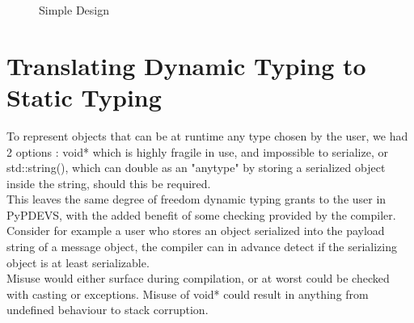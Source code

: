 \documentclass[8pt,a4paper]{report}
\begin{document}
\begin{figure}[h!]
	\caption{Simple Design}
	\label{simpledesign}
\end{figure}



\section{Translating Dynamic Typing to Static Typing}
To represent objects that can be at runtime any type chosen by the user, we had 2 options : void* which is highly fragile in use, and impossible to serialize, or std::string(), which can double as an "anytype" by storing a serialized object inside the string, should this be required. \\This leaves the same degree of freedom dynamic typing grants to the user in PyPDEVS, with the added benefit of some checking provided by the compiler. Consider for example a user who stores an object serialized into the payload string of a message object, the compiler can in advance detect if the serializing object is at least serializable. \\ Misuse would either surface during compilation, or at worst could be checked with casting or exceptions. Misuse of void* could result in anything from undefined behaviour to stack corruption.
\end{document}

